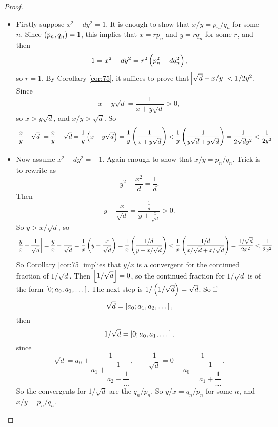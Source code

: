 \begin{proof}
\hfill
\begin{itemize}
\item Firstly suppose $ x^2 - dy^2 = 1 $. It is enough to show that $ x / y = p_n / q_n $ for some $ n $. Since $ \br{p_n, q_n} = 1 $, this implies that $ x = rp_n $ and $ y = rq_n $ for some $ r $, and then
$$ 1 = x^2 - dy^2 = r^2\br{p_n^2 - dq_n^2}, $$
so $ r = 1 $. By Corollary \ref{cor:75}, it suffices to prove that $ \abs{\sqrt{d} - x / y} < 1 / 2y^2 $. Since
$$ x - y\sqrt{d} = \dfrac{1}{x + y\sqrt{d}} > 0, $$
so $ x > y\sqrt{d} $, and $ x / y > \sqrt{d} $. So
$$ \abs{\dfrac{x}{y} - \sqrt{d}} = \dfrac{x}{y} - \sqrt{d} = \dfrac{1}{y}\br{x - y\sqrt{d}} = \dfrac{1}{y}\br{\dfrac{1}{x + y\sqrt{d}}} < \dfrac{1}{y}\br{\dfrac{1}{y\sqrt{d} + y\sqrt{d}}} = \dfrac{1}{2\sqrt{d}y^2} < \dfrac{1}{2y^2}. $$
\item Now assume $ x^2 - dy^2 = -1 $. Again enough to show that $ x / y = p_n / q_n $. Trick is to rewrite as
$$ y^2 - \dfrac{x^2}{d} = \dfrac{1}{d}. $$
Then
$$ y - \dfrac{x}{\sqrt{d}} = \dfrac{\tfrac{1}{d}}{y + \tfrac{x}{\sqrt{d}}} > 0. $$
So $ y > x / \sqrt{d} $, so
$$ \abs{\dfrac{y}{x} - \dfrac{1}{\sqrt{d}}} = \dfrac{y}{x} - \dfrac{1}{\sqrt{d}} = \dfrac{1}{x}\br{y - \dfrac{x}{\sqrt{d}}} = \dfrac{1}{x}\br{\dfrac{1 / d}{y + x / \sqrt{d}}} < \dfrac{1}{x}\br{\dfrac{1 / d}{x / \sqrt{d} + x / \sqrt{d}}} = \dfrac{1 / \sqrt{d}}{2x^2} < \dfrac{1}{2x^2}. $$
So Corollary \ref{cor:75} implies that $ y / x $ is a convergent for the continued fraction of $ 1 / \sqrt{d} $. Then $ \left\lfloor 1 / \sqrt{d} \right\rfloor = 0 $, so the continued fraction for $ 1 / \sqrt{d} $ is of the form $ \sbr{0; a_0, a_1, \dots} $. The next step is $ 1 / \br{1 / \sqrt{d}} = \sqrt{d} $. So if
$$ \sqrt{d} = \sbr{a_0; a_1, a_2, \dots}, $$
then
$$ 1 / \sqrt{d} = \sbr{0; a_0, a_1, \dots}, $$
since
$$ \sqrt{d} = a_0 + \dfrac{1}{a_1 + \dfrac{1}{a_2 + \dfrac{1}{\dots}}}, \qquad \dfrac{1}{\sqrt{d}} = 0 + \dfrac{1}{a_0 + \dfrac{1}{a_1 + \dfrac{1}{\dots}}}. $$
So the convergents for $ 1 / \sqrt{d} $ are the $ q_n / p_n $. So $ y / x = q_n / p_n $ for some $ n $, and $ x / y = p_n / q_n $.
\end{itemize}
\end{proof}

\pagebreak


